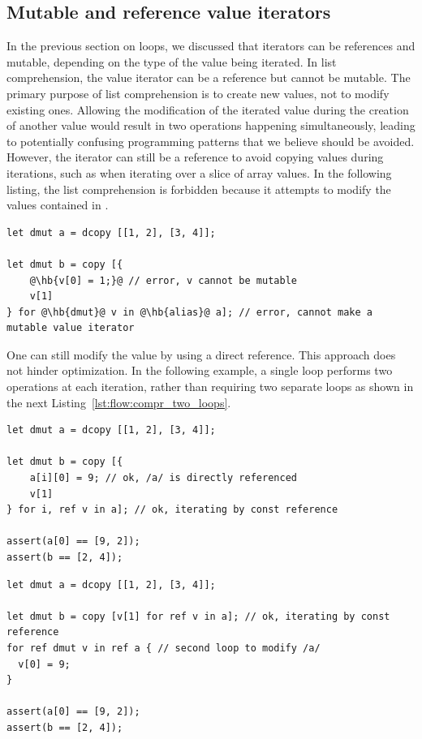 \subsection{Mutable and reference value iterators}

In the previous section on  loops, we discussed that iterators can be
references and mutable, depending on the type of the value being iterated. In
list comprehension, the value iterator can be a reference but cannot be mutable.
The primary purpose of list comprehension is to create new values, not to modify
existing ones. Allowing the modification of the iterated value during the
creation of another value would result in two operations happening
simultaneously, leading to potentially confusing programming patterns that we
believe should be avoided. However, the iterator can still be a reference to
avoid copying values during iterations, such as when iterating over a slice of
array values. In the following listing, the list comprehension is forbidden
because it attempts to modify the values contained in .

\begin{lstlisting}[style=coloredverbatimError, escapechar=@]
let dmut a = dcopy [[1, 2], [3, 4]];

let dmut b = copy [{
    @\hb{v[0] = 1;}@ // error, v cannot be mutable
    v[1]
} for @\hb{dmut}@ v in @\hb{alias}@ a]; // error, cannot make a mutable value iterator
\end{lstlisting}

One can still modify the value  by using a direct reference. This
approach does not hinder optimization. In the following example, a single loop
performs two operations at each iteration, rather than requiring two separate
loops as shown in the next Listing~\ref{lst:flow:compr_two_loops}.

\begin{lstlisting}[style=coloredverbatim, caption=Modify existing value during list comprehension]
let dmut a = dcopy [[1, 2], [3, 4]];

let dmut b = copy [{
    a[i][0] = 9; // ok, /a/ is directly referenced
    v[1]
} for i, ref v in a]; // ok, iterating by const reference

assert(a[0] == [9, 2]);
assert(b == [2, 4]);
\end{lstlisting}

\begin{lstlisting}[style=coloredverbatim, caption=Using two loops, label=lst:flow:compr_two_loops]
let dmut a = dcopy [[1, 2], [3, 4]];

let dmut b = copy [v[1] for ref v in a]; // ok, iterating by const reference
for ref dmut v in ref a { // second loop to modify /a/
  v[0] = 9;
}

assert(a[0] == [9, 2]);
assert(b == [2, 4]);
\end{lstlisting}

